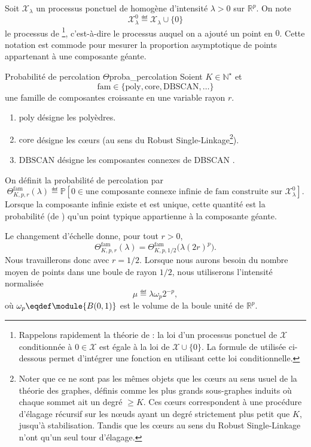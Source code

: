 Soit $\mathcal X_\lambda$ un processus ponctuel de  homogène d'intensité $\lambda>0$ sur $\mathbb R^p$. On note
\[
    \mathcal X_\lambda^0 \eqdef \mathcal X_\lambda\cup\{0\}
\]
le processus de \footnote{Rappelons rapidement la théorie de  \cite{BB} : la loi d'un processus ponctuel de  $\mathcal X$ conditionnée à $0 \in \mathcal X$ est égale à la loi de $\mathcal X \cup \{0\}$. La formule de  utilisée ci-dessous permet d'intégrer une fonction en utilisant cette loi conditionnelle.}, c'est-à-dire le processus auquel on a ajouté un point en $0$. Cette notation est commode pour mesurer la proportion asymptotique de points appartenant à une composante géante.

\begin{Definition}{Probabilité de percolation $\Theta$}{proba_percolation}
Soient $K\in\mathbb N^\star$ et
\[
    \mathrm{fam}\in\{\mathrm{poly},\mathrm{core},\mathrm{DBSCAN},\ldots\}
\]
une famille de composantes croissante en une variable rayon $r$. 
\begin{enumerate}
    \item $\mathrm{poly}$ désigne les polyèdres.
    \item $\mathrm{core}$ désigne les cœurs (au sens du Robust Single-Linkage\footnote{Noter que ce ne sont pas les mêmes objets que les cœurs au sens usuel de la théorie des graphes, définis comme les plus grands sous-graphes induits où chaque sommet ait un degré $\ge K$. Ces cœurs correspondent à une procédure d'élagage récursif sur les nœuds ayant un degré strictement plus petit que $K$, jusqu'à stabilisation. Tandis que les cœurs au sens du Robust Single-Linkage n'ont qu'un seul tour d'élagage.}).
    \item $\mathrm{DBSCAN}$ désigne les composantes connexes de DBSCAN \cite{DBSCAN}.
\end{enumerate} 
On définit la probabilité de percolation par
\[
    \Theta^{\mathrm{fam}}_{K,p,r}(\lambda)
    \eqdef
    \mathbb P\left[
    0\in \text{une composante connexe infinie de }\mathrm{fam}
    \text{ construite sur }\mathcal X_\lambda^0
    \right].
\]
Lorsque la composante infinie existe et est unique, cette quantité est la probabilité (de ) qu'un point typique appartienne à la composante géante.
\end{Definition}

Le changement d'échelle donne, pour tout $r>0$,
\[
    \Theta^{\mathrm{fam}}_{K,p,r}(\lambda)
    =
    \Theta^{\mathrm{fam}}_{K,p,1/2}\bigl(\lambda(2r)^p\bigr).
\]
Nous travaillerons donc avec $r=1/2$. Lorsque nous aurons besoin du nombre moyen de points dans une boule de rayon $1/2$, nous utiliserons l'intensité normalisée
\[
    \mu \eqdef \lambda \omega_p 2^{-p},
\]
où $\omega_p \eqdef \module{B(0,1)}$ est le volume de la boule unité de $\mathbb R^p$.

